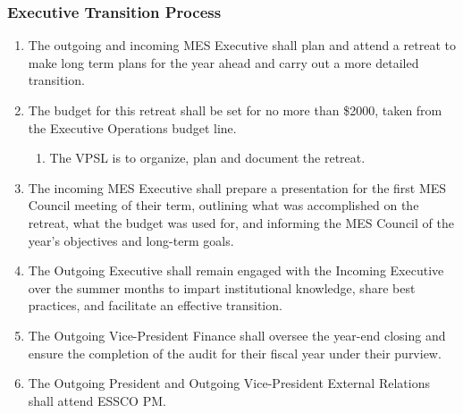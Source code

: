 \subsubsection{Executive Transition Process}
\label{executive-transition-process}
\begin{enumerate}
 \item
  The outgoing and incoming MES Executive shall plan and attend a retreat to make long term plans for the year ahead and carry out a more detailed transition.
 \item
  The budget for this retreat shall be set for no more than \$2000, taken from the Executive Operations budget line.

  \begin{enumerate}
   \item
    The VPSL is to organize, plan and document the retreat.
  \end{enumerate}
 \item
  The incoming MES Executive shall prepare a presentation for the first MES Council meeting of their term, outlining what was accomplished on the retreat, what the budget was used for, and informing the MES Council of the year's objectives and long-term goals.
 \item
  The Outgoing Executive shall remain engaged with the Incoming Executive over the summer months to impart institutional knowledge, share best practices, and facilitate an effective transition.
 \item
  The Outgoing Vice-President Finance shall oversee the year-end closing and ensure the completion of the audit for their fiscal year under their purview.
 \item
  The Outgoing President and Outgoing Vice-President External Relations shall attend ESSCO PM.

\end{enumerate}

